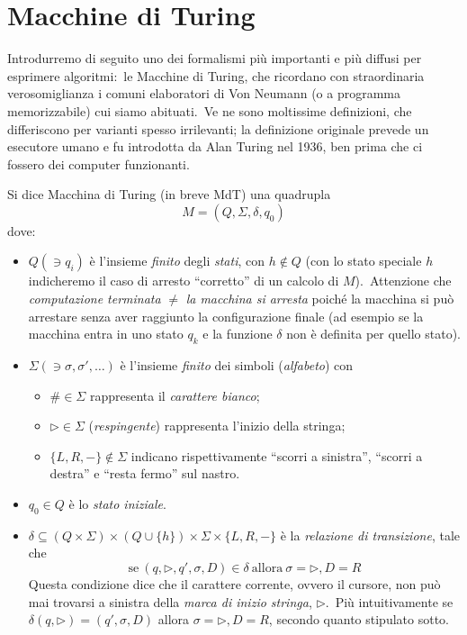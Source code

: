\section{Macchine di Turing}

Introdurremo di seguito uno dei formalismi più importanti e più diffusi per esprimere algoritmi:\ le Macchine di Turing, che ricordano con straordinaria verosomiglianza i comuni elaboratori di Von Neumann (o a programma memorizzabile) cui siamo abituati.\
Ve ne sono moltissime definizioni, che differiscono per varianti spesso irrilevanti; la definizione originale prevede un esecutore umano e fu introdotta da Alan Turing nel 1936, ben prima che ci fossero dei computer funzionanti.\

\begin{definition}
    \label{Macchina di Turing}
    Si dice Macchina di Turing (in breve MdT) una quadrupla \[M=(Q, \Sigma, \delta, q_0)\] dove:

    \begin{itemize}
        \item $Q (\ni q_i)$ è l'insieme \textit{finito} degli \textit{stati}, con $h \not\in Q$ (con lo stato speciale $h$ indicheremo il caso di arresto ``corretto'' di un calcolo di $M$).\ Attenzione che \textit{computazione terminata} $\neq$ \textit{la macchina si arresta} poiché la macchina si può arrestare senza aver raggiunto la configurazione finale (ad esempio se la macchina entra in uno stato $q_k$ e la funzione $\delta$ non è definita per quello stato).
        \item $\Sigma (\ni \sigma, \sigma', \dots)$ è l'insieme \textit{finito} dei simboli (\textit{alfabeto}) con
              \begin{itemize}
                  \item $\# \in \Sigma$ rappresenta il \textit{carattere bianco};
                  \item $\triangleright \in \Sigma$ (\textit{respingente}) rappresenta l'inizio della stringa;
                  \item $\{L, R, -\} \notin \Sigma$ indicano rispettivamente ``scorri a sinistra'', ``scorri a destra'' e ``resta fermo'' sul nastro.
              \end{itemize}
        \item $q_0 \in Q$ è lo \textit{stato iniziale}.
        \item $\delta \subseteq (Q \times \Sigma) \times (Q \cup \{h\}) \times \Sigma \times \{L,R,-\}$ è la \textit{relazione di transizione}, tale che
              \[\mathrm{se}\ (q, \triangleright, q', \sigma, D) \in \delta\ \mathrm{allora}\  \sigma = \triangleright, D = R\]
              Questa condizione dice che il carattere corrente, ovvero il cursore, non può mai trovarsi a sinistra della \textit{marca di inizio stringa}, $\triangleright$.\
              Più intuitivamente se $\delta (q, \triangleright) = (q', \sigma, D)$ allora $\sigma = \triangleright, D = R$, secondo quanto stipulato sotto.


\end{itemize}
\end{definition}
